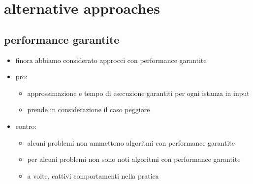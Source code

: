 \section*{alternative approaches}


\subsection*{performance garantite}
\begin{flushleft}
	\begin{itemize}
		\item finora abbiamo considerato approcci con performance garantite
		\item pro:
		\begin{itemize}
			\item approssimazione e tempo di esecuzione garantiti per ogni istanza in input
			\item prende in considerazione il caso peggiore
		\end{itemize}
		\item contro:
		\begin{itemize}
			\item alcuni problemi non ammettono algoritmi con performance garantite
			\item per alcuni problemi non sono noti algoritmi con performance garantite
			\item a volte, cattivi comportamenti nella pratica
		\end{itemize}
	\end{itemize}
\end{flushleft}


